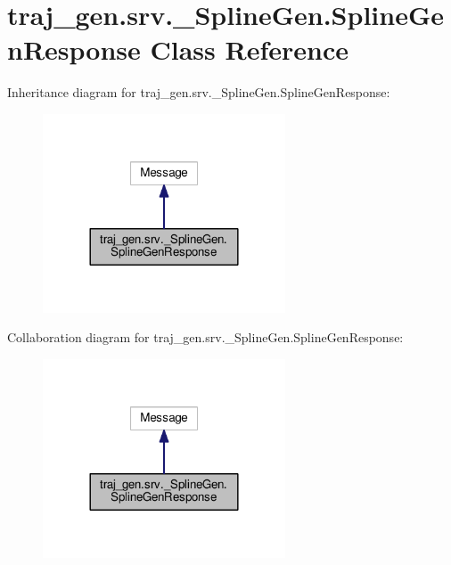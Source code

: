 \hypertarget{classtraj__gen_1_1srv_1_1___spline_gen_1_1_spline_gen_response}{}\section{traj\+\_\+gen.\+srv.\+\_\+\+Spline\+Gen.\+Spline\+Gen\+Response Class Reference}
\label{classtraj__gen_1_1srv_1_1___spline_gen_1_1_spline_gen_response}


Inheritance diagram for traj\+\_\+gen.\+srv.\+\_\+\+Spline\+Gen.\+Spline\+Gen\+Response\+:
\nopagebreak
\begin{figure}[H]
\begin{center}
\leavevmode
\includegraphics[width=204pt]{classtraj__gen_1_1srv_1_1___spline_gen_1_1_spline_gen_response__inherit__graph}
\end{center}
\end{figure}


Collaboration diagram for traj\+\_\+gen.\+srv.\+\_\+\+Spline\+Gen.\+Spline\+Gen\+Response\+:
\nopagebreak
\begin{figure}[H]
\begin{center}
\leavevmode
\includegraphics[width=204pt]{classtraj__gen_1_1srv_1_1___spline_gen_1_1_spline_gen_response__coll__graph}
\end{center}
\end{figure}
